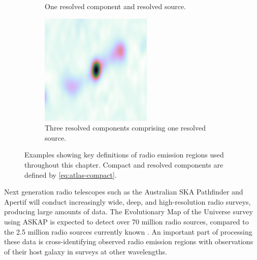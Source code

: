 \begin{figure}
\begin{subfigure}{0.3\textwidth}
            \caption{One resolved component and resolved source.\\\phantom{a}}
        \end{subfigure}
        \begin{subfigure}{0.3\textwidth}
            \includegraphics[width=\textwidth]{atlas-images/cdfs_185_resolved.png}
            \caption{Three resolved components comprising one resolved source.}
        \end{subfigure}
        \caption[Examples showing key definitions of radio emission regions used throughout this chapter.]{\label{fig:definitions} Examples showing key definitions of radio emission regions used throughout this chapter.
                 Compact and resolved components are defined by \autoref{eq:atlas-compact}.}
    \end{figure}

    Next generation radio telescopes such as the Australian SKA Pathfinder \citep[ASKAP;][]{johnston07} and Apertif \citep{verheijen08} will conduct increasingly wide, deep, and high-resolution radio surveys, producing large amounts of data. The Evolutionary Map of the Universe \citep[EMU;][]{norris11} survey using ASKAP is expected to detect over 70 million radio sources, compared to the 2.5 million radio sources currently known \citep{banfield15}. An important part of processing these data is cross-identifying observed radio emission regions with observations of their host galaxy in surveys at other wavelengths.

